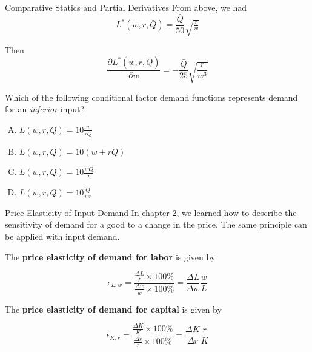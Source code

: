 \documentclass[11pt,t]{beamer}
\begin{document}
\begin{frame}{Comparative Statics and Partial Derivatives }
  From above, we had 
  $$
    L^*(w,r,\bar{Q}) = \frac{\bar{Q}}{50} \sqrt{\tfrac{r}{w}}
  $$

  \bigskip
  Then 
  $$
    \frac{\partial L^*(w,r,\bar{Q})}{\partial w} = -\frac{\bar{Q}}{25} \sqrt{\frac{r}{w^3}} 
  $$
\end{frame}

\begin{frame}

  \bigskip
  Which of the following conditional factor demand functions represents demand for an \textit{inferior} input?

  \bigskip
  \begin{enumerate}[A)]
    \item $L(w,r,Q) =  10\frac{w}{rQ}$

    \item $L(w,r,Q) =  10(w + rQ)$

    \item $L(w,r,Q) =  10\frac{wQ}{r}$

    \item $L(w,r,Q) =  10\frac{Q}{wr}$
  \end{enumerate}
\end{frame}

\begin{frame}{Price Elasticity of Input Demand}
  In chapter 2, we learned how to describe the sensitivity of demand for a good to a change in the price. The same principle can be applied with input demand.

  \bigskip
  The \textbf{price elasticity of demand for labor} is given by

  \begin{equation*}
    \epsilon_{L,w}=\frac{\frac{\Delta L}{L}\times 100\%}{\frac{\Delta w}{w} \times 100 \%} = \frac{\Delta L}{\Delta w}\frac{w}{L}
  \end{equation*}

  \pause\bigskip
  The \textbf{price elasticity of demand for capital} is given by

  \begin{equation*}
    \epsilon_{K,r}=\frac{\frac{\Delta K}{K}\times 100\%}{\frac{\Delta r}{r} \times 100 \%} = \frac{\Delta K}{\Delta r}\frac{r}{K}
  \end{equation*}
\end{frame}
\end{document}
